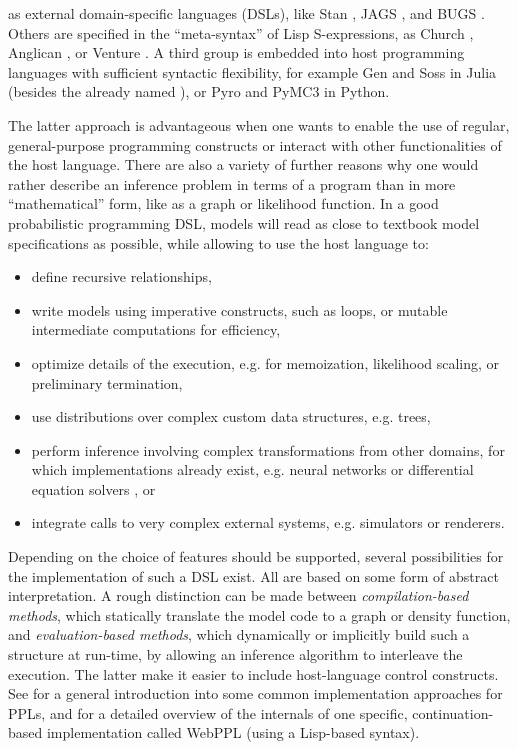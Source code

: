  as external domain-specific languages (DSLs), like Stan
\parencite{carpenter2017stan}, JAGS \parencite{plummer2003jags}, and BUGS
\parencite{lunn2000winbugs,lunn2009bugs}.  Others are specified in the \enquote{meta-syntax} of Lisp
S-expressions, as Church \parencite{goodman2012church}, Anglican \parencite{wood2015new}, or Venture
\parencite{mansinghka2014venture}.  A third group is embedded into host programming languages with
sufficient syntactic flexibility, for example Gen
\parencite{cusumano-towner2019gen,cusumano-towner2020gen} and Soss \parencite{scherrer2019soss} in
Julia (besides the already named \turingjl{}), or Pyro \parencite{bingham2018pyro} and PyMC3
\parencite{salvatier2016probabilistic} in Python.

The latter approach is advantageous when one wants to enable the use of regular, general-purpose
programming constructs or interact with other functionalities of the host language.  There are also
a variety of further reasons why one would rather describe an inference problem in terms of a
program than in more \enquote{mathematical} form, like as a graph or likelihood function.  In a good
probabilistic programming DSL, models will read as close to textbook model specifications as
possible, while allowing to use the host language to:
\begin{itemize}
\item define recursive relationships,
\item write models using imperative constructs, such as loops, or mutable intermediate computations
  for efficiency,
\item optimize details of the execution, e.g. for memoization, likelihood scaling, or preliminary
  termination,
\item use distributions over complex custom data structures, e.g. trees,
\item perform inference involving complex transformations from other domains, for which
  implementations already exist, e.g. neural networks or differential equation solvers , or
\item integrate calls to very complex external systems, e.g. simulators or renderers.
\end{itemize}
Depending on the choice of features should be supported, several possibilities for the
implementation of such a DSL exist.  All are based on some form of abstract interpretation.  A rough
distinction can be made between \emph{compilation-based methods}, which statically translate the
model code to a graph or density function, and \emph{evaluation-based methods}, which dynamically or
implicitly build such a structure at run-time, by allowing an inference algorithm to interleave the
execution.  The latter make it easier to include host-language control constructs.  See
\textcite{vandemeent2018introduction} for a general introduction into some common implementation
approaches for PPLs, and \textcite{goodman2014design} for a detailed overview of the internals of
one specific, continuation-based implementation called WebPPL (using a Lisp-based syntax).

